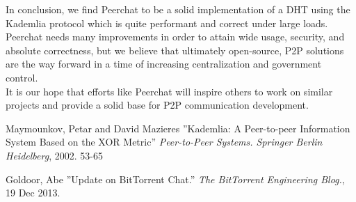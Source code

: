 \documentclass{article}
\begin{document}
In conclusion, we find Peerchat to be a solid implementation of a DHT using the Kademlia protocol which is quite performant and correct under large loads. \\

Peerchat needs many improvements in order to attain wide usage, security, and absolute correctness, but we believe that ultimately open-source, P2P solutions are the way forward in a time of increasing centralization and government control. \\

It is our hope that efforts like Peerchat will inspire others to work on similar projects and provide a solid base for P2P communication development. 

\begin{thebibliography}{99}
   Maymounkov, Petar and David Mazieres
   ''Kademlia: A Peer-to-peer Information System Based on the XOR Metric''
   \textit{Peer-to-Peer Systems. Springer Berlin Heidelberg}, 2002. 53-65

	Goldoor, Abe
	''Update on BitTorrent Chat.''
	\textit{The BitTorrent Engineering Blog.}, 19 Dec 2013.

\end{thebibliography}
\end{document}
